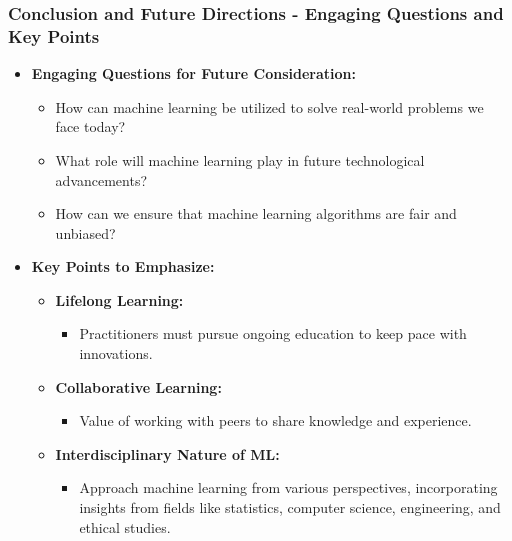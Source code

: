 \documentclass[aspectratio=169]{beamer}
\begin{document}
\begin{frame}[fragile]
    \frametitle{Conclusion and Future Directions - Engaging Questions and Key Points}
    \begin{itemize}
        \item \textbf{Engaging Questions for Future Consideration:}
        \begin{itemize}
            \item How can machine learning be utilized to solve real-world problems we face today?
            \item What role will machine learning play in future technological advancements?
            \item How can we ensure that machine learning algorithms are fair and unbiased?
        \end{itemize}
        
        \item \textbf{Key Points to Emphasize:}
        \begin{itemize}
            \item \textbf{Lifelong Learning:} 
            \begin{itemize}
                \item Practitioners must pursue ongoing education to keep pace with innovations.
            \end{itemize}
            \item \textbf{Collaborative Learning:} 
            \begin{itemize}
                \item Value of working with peers to share knowledge and experience.
            \end{itemize}
            \item \textbf{Interdisciplinary Nature of ML:} 
            \begin{itemize}
                \item Approach machine learning from various perspectives, incorporating insights from fields like statistics, computer science, engineering, and ethical studies.
            \end{itemize}
        \end{itemize}
    \end{itemize}
\end{frame}
\end{document}
